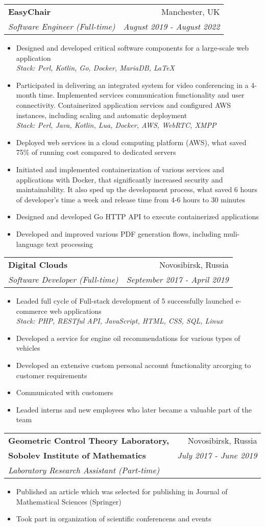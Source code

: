 \documentclass[a4paper,12pt]{extarticle}
\makeatletter
\newcommand{\resumeExperienceItem}[1]{
  \item\small{
    {#1 \vspace{-2pt}}
  }
}
\newcommand{\resumeExperienceItemStack}[2]{
  \resumeExperienceItem{#1 \\ \it{Stack: #2}}
}
\newcommand{\resumeSubheading}[4]{
  \vspace{-1pt}\item
    \begin{tabular*}{0.97\textwidth}{l@{\extracolsep{\fill}}r}
      \textbf{#1} & #2 \\
      \textit{#3} & \textit{#4} \\
    \end{tabular*}\vspace{-5pt}
}
\newcommand{\resumeSubheadingLines}[5]{
  \vspace{-1pt}\item
    \begin{tabular*}{0.97\textwidth}{l@{\extracolsep{\fill}}r}
      \textbf{#1} & #2 \\
      \textbf{#3} & \textit{#4} \\
      \textit{#5} \\
    \end{tabular*}\vspace{-5pt}
}
\newcommand{\resumeItemListStart}{\begin{itemize}}
\newcommand{\resumeItemListEnd}{\end{itemize}\vspace{+3pt}}
\makeatother
\begin{document}
    \resumeSubheading{EasyChair}{Manchester, UK}
    {Software Engineer (Full-time)}{August 2019 - August 2022}
    \resumeItemListStart
        \resumeExperienceItemStack{Designed and developed critical software components for a large-scale web application}
                                  {Perl, Kotlin, Go, Docker, MariaDB, LaTeX}
        \resumeExperienceItemStack{Participated in delivering an integrated system for video conferencing in a 4-month time. Implemented services communication functionality and user connectivity.
                                  Containerized application services and configured AWS instances, including scaling and automatic deployment}
                                 {Perl, Java, Kotlin, Lua, Docker, AWS, WebRTC, XMPP}
        \resumeExperienceItem{Deployed web services in a cloud computing platform (AWS), what saved 75\% of running cost compared to dedicated servers}
        \resumeExperienceItem{Initiated and implemented containerization of various services and applications with Docker, that significantly increased security and maintainability. It also sped up the development process,
                              what saved 6 hours of developer's time a week and release time from 4-6 hours to 30 minutes}
        \resumeExperienceItem{Designed and developed Go HTTP API to execute containerized applications}
        \resumeExperienceItem{Developed and improved various PDF generation flows, including muli-language text processing}
      \resumeItemListEnd

\newpage

    \resumeSubheading
    {Digital Clouds}{Novosibirsk, Russia}
    {Software Developer (Full-time)}{September 2017 -  April 2019}
    \resumeItemListStart
        \resumeExperienceItemStack{Leaded full cycle of Full-stack development of 5 successfully launched e-commerce web applications}
                                  {PHP, RESTful API, JavaScript, HTML, CSS, SQL, Linux}
        \resumeExperienceItem{Developed a service for engine oil recommendations for various types of vehicles}
        \resumeExperienceItem{Developed an extensive custom personal account functionality arcorging to customer requirements}
        \resumeExperienceItem{Communicated with customers}
        \resumeExperienceItem{Leaded interns and new employees who later became a valuable part of the team}
    \resumeItemListEnd

    \vspace{-5pt}

    \resumeSubheadingLines
    {Geometric Control Theory Laboratory,}{Novosibirsk, Russia}
    {Sobolev Institute of Mathematics}{July 2017 -  June 2019}
    {Laboratory Research Assistant (Part-time)}
    \resumeItemListStart
        \resumeExperienceItem{Published an article which was selected for publishing in Journal of Mathematical Sciences (Springer)}
        \resumeExperienceItem{Took part in organization of scientific conferencens and events}
    \resumeItemListEnd
\end{document}
